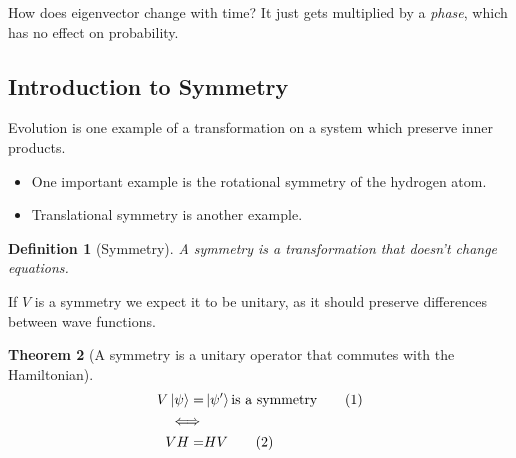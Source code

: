 \documentclass[]{article}
\newcommand\numberthis{\addtocounter{equation}{1}\tag{\theequation}}
\newtheorem{thm}{Theorem}
\newtheorem{defn}[thm]{Definition}
\begin{document}
How does eigenvector change with time? It just gets multiplied by a \emph{phase}, which has no effect on probability.

\subsection{Introduction to Symmetry}

Evolution is one example of a transformation on a system which preserve inner products.
\begin{itemize}
	\item One important example is the rotational symmetry of the hydrogen atom.
	\item Translational symmetry is another example.
\end{itemize}

\begin{defn}[Symmetry]\label{defn:symmetry}
	A symmetry is a transformation that doesn't change equations. 
\end{defn}

If $V$ is a symmetry we expect it to be unitary, as it should preserve differences between wave functions.

\begin{thm}[A symmetry is a unitary operator that commutes with the Hamiltonian]
	\begin{align*}
	V \ket{\psi} =& \ket{\psi^{\prime}} \text{is a symmetry}\numberthis \label{eq:symmetry}\\
	\iff&\\
	V H =& H V\numberthis \label{eq:symmetry:commute}
	\end{align*}
\end{thm}
\end{document}
